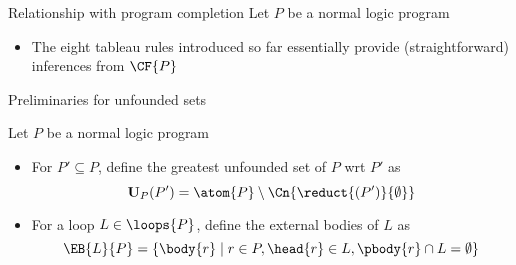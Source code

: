 \begin{frame}{Relationship with program completion}
Let $P$ be a normal logic program

\begin{itemize}
\item <1-> The eight tableau rules introduced so far essentially provide
  (straightforward) inferences from $\CF{P}$  %
\end{itemize}
\end{frame}
\begin{frame}{Preliminaries for unfounded sets}

Let $P$ be a normal logic program
\begin{itemize}
\item<1-> For $P'\subseteq P$, define the \alert{greatest unfounded set} of $P$ wrt $P'$ as
\[
\mathbf{U}_P(P') = \atom{P}\setminus \Cn{\reduct{(P')}{\emptyset}}
\]
\item<2-> For a loop $L \in \loops{P}$, define the \alert{external bodies} of $L$ as
\[
\EB{L}{P} = \{\body{r} \mid r \in P, \head{r} \in L, \pbody{r} \cap L = \emptyset\}
\]
\end{itemize}
\end{frame}
